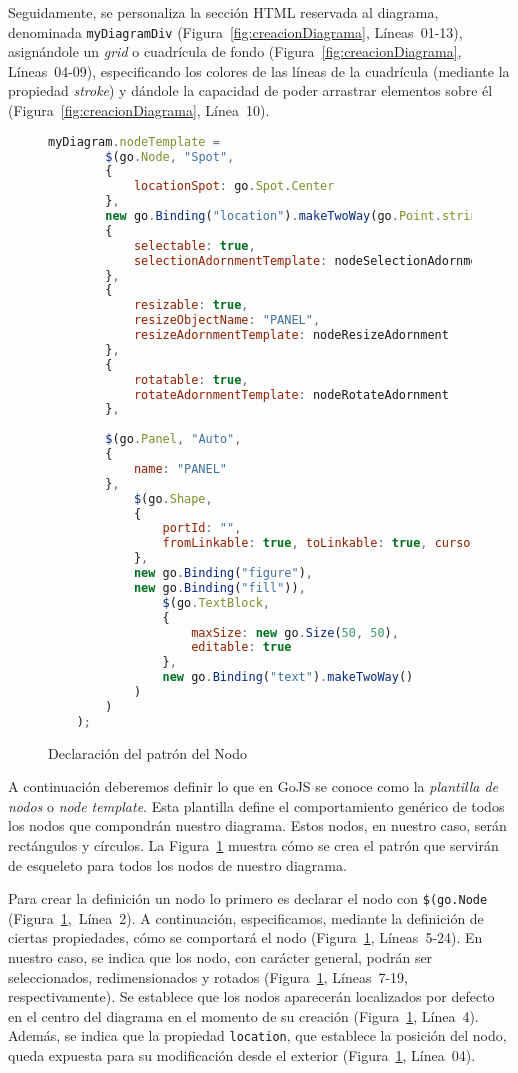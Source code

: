 Seguidamente, se personaliza la sección HTML reservada al diagrama, denominada \texttt{myDiagramDiv} (Figura~\ref{fig:creacionDiagrama}, Líneas~01-13), asignándole un \emph{grid} o cuadrícula de fondo (Figura~\ref{fig:creacionDiagrama}, Líneas~04-09), especificando los colores de las líneas de la cuadrícula (mediante la propiedad \emph{stroke}) y dándole la capacidad de poder arrastrar elementos sobre él (Figura~\ref{fig:creacionDiagrama}, Línea~10).


\begin{figure}[H]
	\centering
	\begin{lstlisting}[language=JavaScript]
	myDiagram.nodeTemplate =
		$(go.Node, "Spot",
		{ 
			locationSpot: go.Spot.Center 
		},
		new go.Binding("location").makeTwoWay(go.Point.stringify),
		{ 
			selectable: true, 
			selectionAdornmentTemplate: nodeSelectionAdornment 
		},
		{ 
			resizable: true, 
			resizeObjectName: "PANEL", 
			resizeAdornmentTemplate: nodeResizeAdornment 
		},
		{ 
			rotatable: true, 
			rotateAdornmentTemplate: nodeRotateAdornment 
		},
		
		$(go.Panel, "Auto",
		{ 
			name: "PANEL" 
		},
			$(go.Shape,
			{
				portId: "",
				fromLinkable: true, toLinkable: true, cursor: "pointer",
			},
			new go.Binding("figure"),
			new go.Binding("fill")),
				$(go.TextBlock,
				{
					maxSize: new go.Size(50, 50),
					editable: true
				},
				new go.Binding("text").makeTwoWay()
			)
		)
	);\end{lstlisting}
	\caption{Declaración del patrón del Nodo}
	\label{fig:patronNodo}
\end{figure}

A continuación deberemos definir lo que en GoJS se conoce como la \emph{plantilla de nodos} o \emph{node template}. Esta plantilla define el comportamiento genérico de todos los nodos que compondrán nuestro diagrama. Estos nodos, en nuestro caso, serán rectángulos y círculos. La Figura~\ref{fig:patronNodo} muestra cómo se crea el patrón que servirán de esqueleto para todos los nodos de nuestro diagrama. 



Para crear la definición un nodo lo primero es declarar el nodo con \texttt{\$(go.Node} (Figura~\ref{fig:patronNodo},~Línea~2).
A continuación, especificamos, mediante la definición de ciertas propiedades, cómo se comportará el nodo (Figura~\ref{fig:patronNodo}, Líneas~5-24). En nuestro caso, se indica que los nodo, con carácter general, podrán ser seleccionados, redimensionados y rotados (Figura~\ref{fig:patronNodo}, Líneas~7-19, respectivamente). Se establece que los nodos aparecerán localizados por defecto en el centro del diagrama en el momento de su creación (Figura~\ref{fig:patronNodo}, Línea~4).
Además, se indica que la propiedad \texttt{location}, que establece la posición del nodo, queda expuesta para su modificación desde el exterior (Figura~\ref{fig:patronNodo}, Línea~04).


